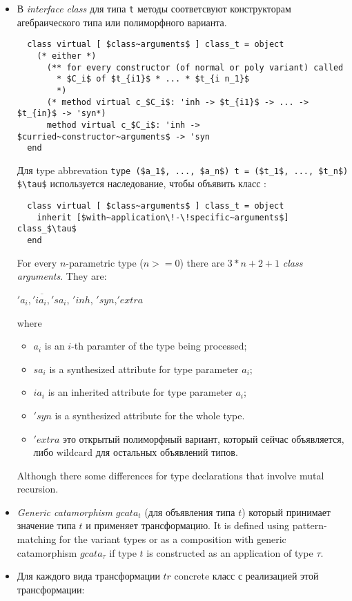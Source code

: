 \documentclass[acmsmall,review,anonymous]{acmart}\settopmatter{printfolios=true,printccs=false,printacmref=false}
\begin{document}
\begin{itemize}
  \item В \textit{interface class} для типа \lstinline{t} методы соответсвуют конструкторам агебраического типа или полиморфного варианта. 
  \begin{lstlisting}
  class virtual [ $class~arguments$ ] class_t = object
    (* either *)
      (** for every constructor (of normal or poly variant) called
        * $C_i$ of $t_{i1}$ * ... * $t_{i n_1}$
        *)
      (* method virtual c_$C_i$: 'inh -> $t_{i1}$ -> ... ->  $t_{in}$ -> 'syn*)
      method virtual c_$C_i$: 'inh -> $curried~constructor~arguments$ -> 'syn
  end
  \end{lstlisting}
  Для type abbrevation \lstinline{type ($a_1$, ..., $a_n$) t = ($t_1$, ..., $t_n$) $\tau$} используется наследование, чтобы объявить класс : 
  \begin{lstlisting}
  class virtual [ $class~arguments$ ] class_t = object
    inherit [$with~application\!-\!specific~arguments$] class_$\tau$
  end
  \end{lstlisting}

  For every $n$-parametric type ($n>=0$) there are $3*n+2+1$ \textit{class arguments}. They are:
    \begin{center}
        $\overline{'a_i, 'ia_i, 'sa_i}$, $'inh$, $'syn$,$'extra$
    \end{center}
  where \begin{itemize}
          \item $a_i$ is an $i$-th paramter of the type being processed;
          \item $sa_i$ is a synthesized attribute for type parameter $a_i$;
          \item $ia_i$ is an inherited attribute for type parameter $a_i$;
          \item $'syn$ is a synthesized attribute for the whole type.
          \item $'extra$ это открытый полиморфный вариант, который сейчас объявляется, либо wildcard для остальных объявлений типов.
  \end{itemize}
  
  Although there some differences for type declarations that involve mutal recursion.
  
  \item \textit{Generic catamorphism} $gcata_t$ (для объявления типа $t$) который принимает значение типа $t$ и применяет трансформацию. It is defined using pattern-matching for the variant types or as a composition with generic catamorphism $gcata_\tau$ if type $t$ is constructed as an application of type $\tau$.
  \item Для каждого вида трансформации $tr$ concrete класс с реализацией этой трансформации:


\end{itemize}
\end{document}

